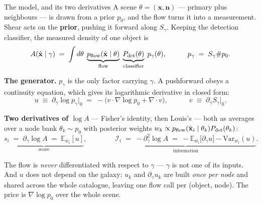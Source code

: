 \documentclass[aspectratio=169,10pt]{beamer}
\newcommand{\xh}{\hat{\mathbf{x}}}
\newcommand{\xt}{\mathbf{x}}
\newcommand{\nb}{\mathbf{n}}
\begin{document}
\begin{frame}{The model, and its two derivatives }
\vspace{1mm}
{\small A scene $\theta=(\xt,\nb)$ --- primary plus neighbours --- is drawn from a prior $p_0$, and the
flow turns it into a measurement. Shear acts on the \textbf{prior}, pushing it forward along
$S_\gamma$. Keeping the detection classifier, the measured density of one object is}
\vspace{-2mm}
\[ A(\xh\mid\gamma)\;=\;\int d\theta\;
   \underbrace{p_{\rm flow}(\xh\mid\theta)}_{\text{flow}}\;
   \underbrace{P_{\rm det}(\theta)}_{\text{classifier}}\;p_\gamma(\theta),
   \qquad\quad p_\gamma\;=\;S_\gamma\#p_0 . \]

\vspace{-2mm}
{\small \textbf{The generator.} $p_\gamma$ is the only factor carrying $\gamma$. A pushforward obeys a
continuity equation, which gives its logarithmic derivative in closed form:}
\vspace{-2mm}
\[ u\;\equiv\;\partial_\gamma\log p_\gamma\big|_0
   \;=\;-\big(v\cdot\nabla\log p_0+\nabla\!\cdot\!v\big),
   \qquad\quad v\;\equiv\;\partial_\gamma S_\gamma\big|_0 . \]

\vspace{-2mm}
{\small \textbf{Two derivatives of $\log A$} --- Fisher's identity, then Louis's --- both as averages
over a node bank $\theta_k\sim p_0$ with posterior weights
$w_k\propto p_{\rm flow}(\xh_i\mid\theta_k)P_{\rm det}(\theta_k)$:}
\vspace{-2mm}
\[ \underbrace{s_i\;=\;\partial_\gamma\log A\;=\;\mathbb{E}_{w_i}[u]}_{\text{score}},
   \qquad\qquad
   \underbrace{\mathcal{I}_i\;=\;-\partial^2_\gamma\log A
   \;=\;-\mathbb{E}_{w_i}\big[\partial_\gamma u\big]-\mathrm{Var}_{w_i}(u)}_{\text{information}} . \]

\vspace{-1mm}
{\scriptsize\color{black!75}
The flow is \emph{never} differentiated with respect to $\gamma$ --- $\gamma$ is not one of its
inputs. And $u$ does not depend on the galaxy: $u_k$ and $\partial_\gamma u_k$ are built \emph{once
per node} and shared across the whole catalogue, leaving one flow call per (object, node). The price
is $\nabla\log p_0$ over the whole scene.}
\end{frame}
\end{document}
